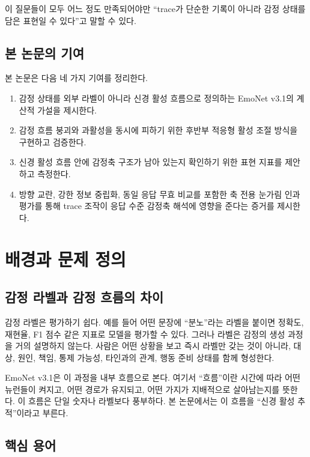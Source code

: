 \documentclass[11pt,a4paper]{article}
\begin{document}
이 질문들이 모두 어느 정도 만족되어야만 ``trace가 단순한 기록이 아니라 감정 상태를 담은 표현일 수 있다''고 말할 수 있다.

\subsection{본 논문의 기여}

본 논문은 다음 네 가지 기여를 정리한다.

\begin{enumerate}
  \item 감정 상태를 외부 라벨이 아니라 신경 활성 흐름으로 정의하는 EmoNet v3.1의 계산적 가설을 제시한다.
  \item 감정 흐름 붕괴와 과활성을 동시에 피하기 위한 후반부 적응형 활성 조절 방식을 구현하고 검증한다.
  \item 신경 활성 흐름 안에 감정축 구조가 남아 있는지 확인하기 위한 표현 지표를 제안하고 측정한다.
  \item 방향 교란, 강한 정보 중립화, 동일 응답 무효 비교를 포함한 축 전용 눈가림 인과 평가를 통해 trace 조작이 응답 수준 감정축 해석에 영향을 준다는 증거를 제시한다.
\end{enumerate}

\section{배경과 문제 정의}

\subsection{감정 라벨과 감정 흐름의 차이}

감정 라벨은 평가하기 쉽다. 예를 들어 어떤 문장에 ``분노''라는 라벨을 붙이면 정확도, 재현율, F1 점수 같은 지표로 모델을 평가할 수 있다. 그러나 라벨은 감정의 생성 과정을 거의 설명하지 않는다. 사람은 어떤 상황을 보고 즉시 라벨만 갖는 것이 아니라, 대상, 원인, 책임, 통제 가능성, 타인과의 관계, 행동 준비 상태를 함께 형성한다.

EmoNet v3.1은 이 과정을 내부 흐름으로 본다. 여기서 ``흐름''이란 시간에 따라 어떤 뉴런들이 켜지고, 어떤 경로가 유지되고, 어떤 가지가 지배적으로 살아남는지를 뜻한다. 이 흐름은 단일 숫자나 라벨보다 풍부하다. 본 논문에서는 이 흐름을 ``신경 활성 추적''이라고 부른다.

\subsection{핵심 용어}
\end{document}

